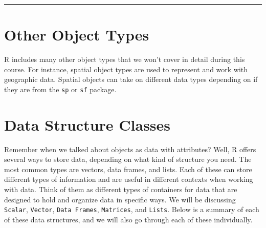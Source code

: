\documentclass[
]{book}
\begin{document}
\begin{center}\rule{0.5\linewidth}{0.5pt}\end{center}

\section{Other Object Types}\label{other-object-types}

R includes many other object types that we won't cover in detail during this course. For instance, spatial object types are used to represent and work with geographic data. Spatial objects can take on different data types depending on if they are from the \texttt{sp} or \texttt{sf} package.

\section{Data Structure Classes}\label{data-classes}

Remember when we talked about objects as data with attributes? Well, R offers several ways to store data, depending on what kind of structure you need. The most common types are vectors, data frames, and lists. Each of these can store different types of information and are useful in different contexts when working with data. Think of them as different types of containers for data that are designed to hold and organize data in specific ways. We will be discussing \texttt{Scalar}, \texttt{Vector}, \texttt{Data\ Frames}, \texttt{Matrices}, and \texttt{Lists}. Below is a summary of each of these data structures, and we will also go through each of these individually.
\end{document}
